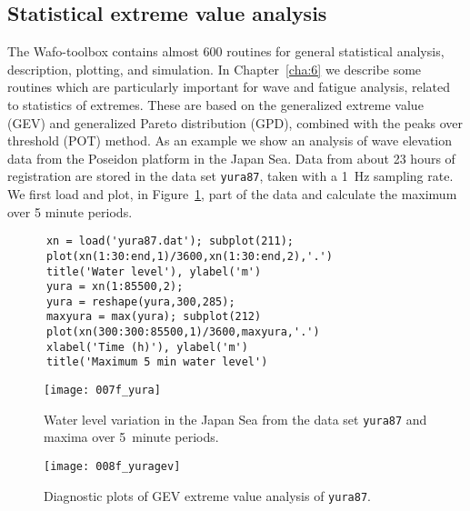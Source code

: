 {\subsection{Statistical extreme value analysis}\label{sec:extreme_example} %
The {\sc Wafo}-toolbox contains almost 600 routines for general
statistical analysis, description, plotting, and simulation.
In Chapter~\ref{cha:6} we describe some routines which are particularly
important for wave and fatigue analysis, related to statistics of extremes.
These are based on the generalized extreme value (GEV) and generalized Pareto
distribution (GPD), combined with the peaks over threshold (POT) method.
As an example we show an analysis of wave elevation data from the
Poseidon platform in the Japan Sea. Data from about 23 hours of registration
are stored in the data set {\tt yura87}, taken with a 1~Hz sampling rate.
We first load and plot, in Figure~\ref{fig:yura87},
part of the data and calculate the maximum over 5 minute periods.
{\small\begin{verbatim}
      xn = load('yura87.dat'); subplot(211);
      plot(xn(1:30:end,1)/3600,xn(1:30:end,2),'.')
      title('Water level'), ylabel('m')
      yura = xn(1:85500,2);
      yura = reshape(yura,300,285);
      maxyura = max(yura); subplot(212)
      plot(xn(300:300:85500,1)/3600,maxyura,'.')
      xlabel('Time (h)'), ylabel('m')
      title('Maximum 5 min water level')
\end{verbatim}}

  \begin{figure}[tbh]
\centering
\texttt{[image: 007f\_yura]}
\vspace{-3mm}
\caption[Water level in the Japan Sea]{Water level variation in the Japan Sea
from the data set {\tt yura87} and maxima over 5~minute periods.}
\label{fig:yura87}
\end{figure}

\begin{figure}[tbh]
\centering
\texttt{[image: 008f\_yuragev]}
\vspace{-3mm}
\caption[Extreme value analysis of {\tt yura87}]
{Diagnostic plots of GEV extreme value analysis of {\tt yura87}.}
\label{fig:yuragev}
\end{figure}

}
